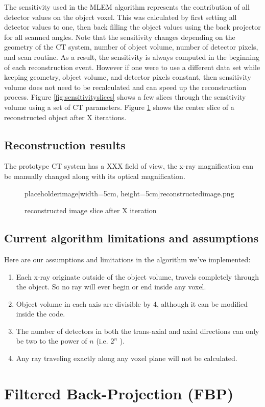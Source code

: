 The sensitivity used in the MLEM algorithm represents the contribution of all detector values on the object voxel.  This was calculated by first setting all detector values to one, then back filling the object values using the back projector for all scanned angles.  Note that the sensitivity changes depending on the geometry of the CT system, number of object volume, number of detector pixels, and scan routine.  As a result, the sensitivity is always computed in the beginning of each reconstruction event.  However if one were to use a different data set while keeping geometry, object volume, and detector pixels constant, then sensitivity volume does not need to be recalculated and can speed up the reconstruction process.  Figure \ref{fig:sensitivityslices} shows a few slices through the sensitivity volume using a set of CT parameters.
Figure \ref{fig:reconstructedimage} shows the center slice of a reconstructed object after X iterations.

\subsection{Reconstruction results}
The prototype CT system has a XXX field of view, the x-ray magnification can be manually changed along with its optical magnification.  
\begin{figure}
\centering
placeholderimage[width=5cm, height=5cm]{reconstructedimage.png}
\label{fig:reconstructedimage}
\caption{reconstructed image slice after X iteration}
\end{figure}

\subsection{Current algorithm limitations and assumptions}
Here are our assumptions and limitations in the algorithm we've implemented:
\begin{enumerate}
\item Each x-ray originate outside of the object volume, travels completely through the object.  So no ray will ever begin or end inside any voxel.
\item Object volume in each axis are divisible by 4, although it can be modified inside the code.
\item The number of detectors in both the trans-axial and axial directions can only be two to the power of $n$ (i.e. $2^n$ ).
\item Any ray traveling exactly along any voxel plane will not be calculated.
\end{enumerate}




\section{Filtered Back-Projection (FBP) }



